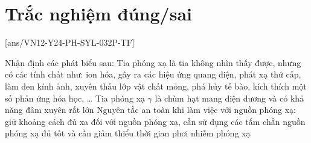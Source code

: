 \section{Trắc nghiệm đúng/sai}
[ans/VN12-Y24-PH-SYL-032P-TF]
\setcounter{ex}{0}
\begin{ex}
	Nhận định các phát biểu sau:
	{\True Tia phóng xạ là tia không nhìn thấy được, nhưng có các tính chất như: ion hóa, gây ra các hiệu ứng quang điện, phát xạ thứ cấp, làm đen kính ảnh, xuyên thấu lớp vật chất mỏng, phá hủy tế bào, kích thích một số phản ứng hóa học, \dots}
	{Tia phóng xạ $\gamma$ là chùm hạt mang điện dương và có khả năng đâm xuyên rất lớn}
	{\True Nguyên tắc an toàn khi làm việc với nguồn phóng xạ: giữ khoảng cách đủ xa đối với nguồn phóng xạ, cần sử dụng các tấm chắn nguồn phóng xạ đủ tốt và cần giảm thiểu thời gian phơi nhiễm phóng xạ}
	\loigiai{}
\end{ex}
